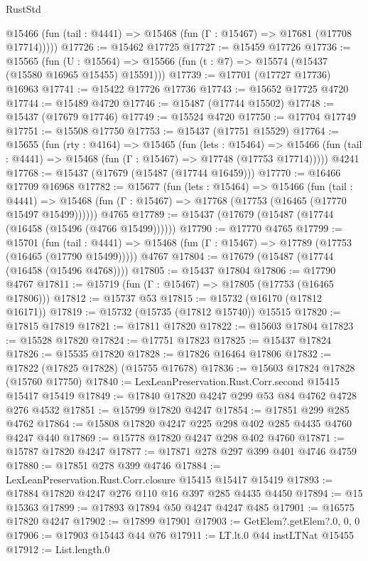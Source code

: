 \begin{lexlean}{RustStd}
\begin{coremodule}
      @15466 (fun (tail : @4441) => @15468 (fun (Γ : @15467) => @17681 (@17708 @17714)))))
@17726 := @15462 @17725
@17727 := @15459 @17726
@17736 := @15565
    (fun (U : @15564) => @15566 (fun (t : @7) => @15574 (@15437 (@15580 @16965 @15455) @15591)))
@17739 := @17701 (@17727 @17736) @16963
@17741 := @15422 @17726 @17736
@17743 := @15652 @17725 @4720
@17744 := @15489 @4720
@17746 := @15487 (@17744 @15502)
@17748 := @15437 (@17679 @17746)
@17749 := @15524 @4720
@17750 := @17704 @17749
@17751 := @15508 @17750
@17753 := @15437 (@17751 @15529)
@17764 := @15655
    (fun (rty : @4164) =>
    @15465
      (fun (lets : @15464) =>
      @15466 (fun (tail : @4441) => @15468 (fun (Γ : @15467) => @17748 (@17753 @17714)))))
    @4241
@17768 := @15437 (@17679 (@15487 (@17744 @16459)))
@17770 := @16466 @17709 @16968
@17782 := @15677
    (fun (lets : @15464) =>
    @15466
      (fun (tail : @4441) =>
      @15468 (fun (Γ : @15467) => @17768 (@17753 (@16465 (@17770 @15497 @15499))))))
    @4765
@17789 := @15437 (@17679 (@15487 (@17744 (@16458 (@15496 (@4766 @15499))))))
@17790 := @17770 @4765
@17799 := @15701
    (fun (tail : @4441) => @15468 (fun (Γ : @15467) => @17789 (@17753 (@16465 (@17790 @15499)))))
    @4767
@17804 := @17679 (@15487 (@17744 (@16458 (@15496 @4768))))
@17805 := @15437 @17804
@17806 := @17790 @4767
@17811 := @15719 (fun (Γ : @15467) => @17805 (@17753 (@16465 @17806)))
@17812 := @15737 @53
@17815 := @15732 (@16170 (@17812 @16171))
@17819 := @15732 (@15735 (@17812 @15740)) @15515
@17820 := @17815 @17819
@17821 := @17811 @17820
@17822 := @15603 @17804
@17823 := @15528 @17820
@17824 := @17751 @17823
@17825 := @15437 @17824
@17826 := @15535 @17820
@17828 := @17826 @16464 @17806
@17832 := @17822 (@17825 @17828) (@15755 @17678)
@17836 := @15603 @17824 @17828 (@15760 @17750)
@17840 := LexLeanPreservation.Rust.Corr.second @15415 @15417 @15419
@17849 := @17840 @17820 @4247 @299 @53 @84 @4762 @4728 @276 @4532
@17851 := @15799 @17820 @4247
@17854 := @17851 @299 @285 @4762
@17864 := @15808 @17820 @4247 @225 @298 @402 @285 @4435 @4760 @4247 @440
@17869 := @15778 @17820 @4247 @298 @402 @4760
@17871 := @15787 @17820 @4247
@17877 := @17871 @278 @297 @399 @401 @4746 @4759
@17880 := @17851 @278 @399 @4746
@17884 := LexLeanPreservation.Rust.Corr.closure @15415 @15417 @15419
@17893 := @17884 @17820 @4247 @276 @110 @16 @397 @285 @4435 @4450
@17894 := @15 @15363
@17899 := @17893 @17894 @50 @4247 @4247 @485
@17901 := @16575 @17820 @4247
@17902 := @17899 @17901
@17903 := GetElem?.getElem?.{0, 0, 0}
@17906 := @17903 @15443 @44 @76
@17911 := LT.lt.{0} @44 instLTNat @15455
@17912 := List.length.{0}

\end{coremodule}
\end{lexlean}

